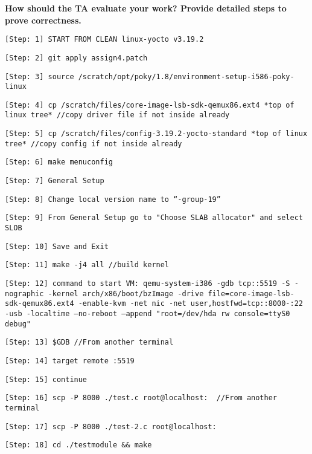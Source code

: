 \documentclass[10pt,letterpaper,draftclsnofoot,onecolumn]{IEEEtran}
\begin{document}
\noindent\textbf{How should the TA evaluate your work? Provide detailed steps to prove correctness.}
\begin{description}
\item \texttt{[Step: 1] START FROM CLEAN linux-yocto v3.19.2}
\item \texttt{[Step: 2] git apply assign4.patch}
\item \texttt{[Step: 3] source /scratch/opt/poky/1.8/environment-setup-i586-poky-linux}
\item \texttt{[Step: 4] cp /scratch/files/core-image-lsb-sdk-qemux86.ext4 *top of linux tree* \newline //copy driver file if not inside already}
\item \texttt{[Step: 5] cp /scratch/files/config-3.19.2-yocto-standard *top of linux tree* \newline//copy config if not inside already}
\item \texttt{[Step: 6] make menuconfig}
\item \texttt{[Step: 7] General Setup}
\item \texttt{[Step: 8] Change local version name to “-group-19”}
\item \texttt{[Step: 9] From General Setup go to "Choose SLAB allocator" and select SLOB}
\item \texttt{[Step: 10] Save and Exit}
\item \texttt{[Step: 11] make -j4 all \newline //build kernel}
\item \texttt{[Step: 12] command to start VM: \newline qemu-system-i386 -gdb tcp::5519 -S -nographic -kernel arch/x86/boot/bzImage -drive file=core-image-lsb-sdk-qemux86.ext4 -enable-kvm -net nic -net user,hostfwd=tcp::8000-:22 -usb -localtime --no-reboot --append "root=/dev/hda rw console=ttyS0 debug"}
\item \texttt{[Step: 13] \$GDB \newline //From another terminal}
\item \texttt{[Step: 14] target remote :5519}
\item \texttt{[Step: 15] continue}
\item \texttt{[Step: 16] scp -P 8000 ./test.c root@localhost:~ \newline //From another terminal}
\item \texttt{[Step: 17] scp -P 8000 ./test-2.c root@localhost:~}
\item \texttt{[Step: 18] cd ./testmodule && make}

\end{description}
\end{document}
